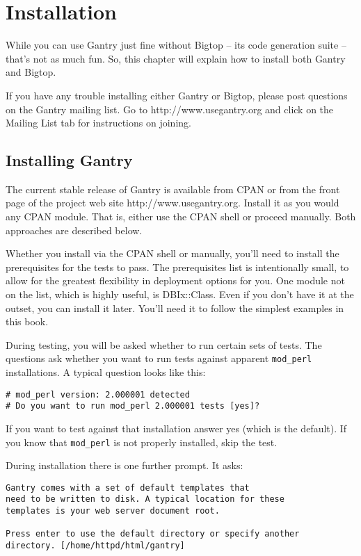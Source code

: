\chapter{Installation}
\label{chap:install}

While you can use Gantry just fine without Bigtop -- its code generation
suite -- that's not as much fun.  So, this chapter will explain how to install
both Gantry and Bigtop.

If you have any trouble installing either Gantry or Bigtop, please post
questions on the Gantry mailing list.  Go to http://www.usegantry.org
and click on the Mailing List tab for instructions on joining.

\section{Installing Gantry}

The current stable release of Gantry is available from CPAN or from the
front page of the project web site http://www.usegantry.org.  Install it as
you would any CPAN module.  That is, either use the CPAN shell or proceed
manually.  Both approaches are described below.

Whether you install via the CPAN shell or manually, you'll need to install
the prerequisites for the tests to pass.  The prerequisites list is
intentionally small, to allow for the greatest flexibility in deployment
options for you.  One module not on the list, which is highly useful, is
DBIx::Class.  Even if you don't have it at the outset, you can install
it later.  You'll need it to follow the simplest examples in this book.

During testing, you will be asked whether to run certain sets of tests.  The
questions ask whether you want to run tests against apparent \verb+mod_perl+
installations.  A typical question looks like this:

\begin{verbatim}
# mod_perl version: 2.000001 detected
# Do you want to run mod_perl 2.000001 tests [yes]?
\end{verbatim}

If you want to test against that installation answer yes (which is the
default).  If you know that \verb+mod_perl+ is not properly installed,
skip the test.

During installation there is one further prompt.  It asks:

\begin{verbatim}
Gantry comes with a set of default templates that
need to be written to disk. A typical location for these
templates is your web server document root.

Press enter to use the default directory or specify another
directory. [/home/httpd/html/gantry]
\end{verbatim}

